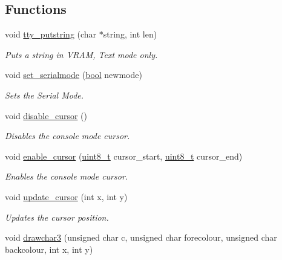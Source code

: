 \subsection*{Functions}
\begin{DoxyCompactItemize}
\item 
void \hyperlink{a00179_a5b5bf610a57f3c59b2851fa2652081ec_a5b5bf610a57f3c59b2851fa2652081ec}{tty\+\_\+putstring} (char $\ast$string, int len)
\begin{DoxyCompactList}\small\item\em Puts a string in V\+R\+AM, Text mode only. \end{DoxyCompactList}\item 
void \hyperlink{a00179_ab1cdfeb7dac30904e66f81ab673ed8ca_ab1cdfeb7dac30904e66f81ab673ed8ca}{set\+\_\+serialmode} (\hyperlink{a00140_af6a258d8f3ee5206d682d799316314b1_af6a258d8f3ee5206d682d799316314b1}{bool} newmode)
\begin{DoxyCompactList}\small\item\em Sets the Serial Mode. \end{DoxyCompactList}\item 
void \hyperlink{a00179_a3d09038c7b6436e60b228f2f3f451f6a_a3d09038c7b6436e60b228f2f3f451f6a}{disable\+\_\+cursor} ()
\begin{DoxyCompactList}\small\item\em Disables the console mode cursor. \end{DoxyCompactList}\item 
void \hyperlink{a00179_afe197dc4dbfa6036ef04abd2aeeeca2d_afe197dc4dbfa6036ef04abd2aeeeca2d}{enable\+\_\+cursor} (\hyperlink{a00140_aba7bc1797add20fe3efdf37ced1182c5_aba7bc1797add20fe3efdf37ced1182c5}{uint8\+\_\+t} cursor\+\_\+start, \hyperlink{a00140_aba7bc1797add20fe3efdf37ced1182c5_aba7bc1797add20fe3efdf37ced1182c5}{uint8\+\_\+t} cursor\+\_\+end)
\begin{DoxyCompactList}\small\item\em Enables the console mode cursor. \end{DoxyCompactList}\item 
void \hyperlink{a00179_a492f5021d7340613e732ef37bbaa04e4_a492f5021d7340613e732ef37bbaa04e4}{update\+\_\+cursor} (int x, int y)
\begin{DoxyCompactList}\small\item\em Updates the cursor position. \end{DoxyCompactList}\item 
void \hyperlink{a00179_acb9a978008cfa67b0038e85eb56d2d41_acb9a978008cfa67b0038e85eb56d2d41}{drawchar3} (unsigned char c, unsigned char forecolour, unsigned char backcolour, int x, int y)

\end{DoxyCompactItemize}
